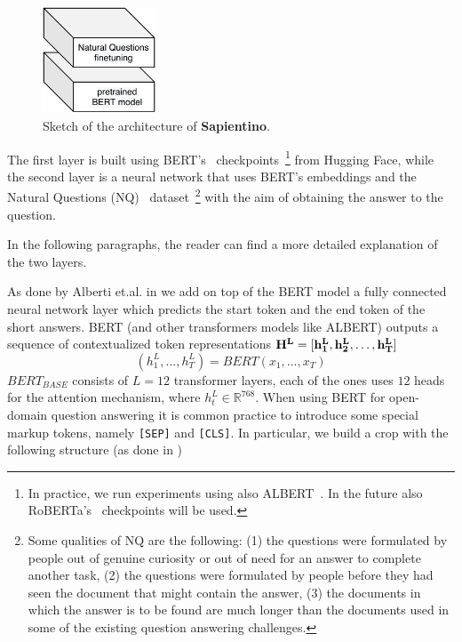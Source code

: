 \documentclass[10pt,hidelinks]{article}
\newcommand\nomefico{\textbf{Sapientino}}
\newcommand{\R}{\mathds{R}}
\begin{document}
\begin{figure}[ht!]
    \centering
    \includegraphics[width=0.3\textwidth]{pics/broad_architecture.pdf}
    \caption{Sketch of the architecture of \nomefico.}\label{fig:broad_architecture}
\end{figure}

The first layer is built using BERT's~\cite{devlin2018bert} checkpoints~\footnote{In practice, we run experiments using also ALBERT~\cite{albert}. In the future also RoBERTa's~\cite{roberta} checkpoints will be used.} from Hugging Face, while the second layer is a neural network that uses BERT's embeddings and the Natural Questions (NQ)~\cite{kwiatowski} dataset~\footnote{Some qualities of NQ are the following: (1) the questions were formulated by people out of genuine curiosity or out of need for an answer to complete another task, (2) the questions were formulated by people before they had seen the document that might contain the answer, (3) the documents in which the answer is to be found are much longer than the documents used in some of the existing question answering challenges.} with the aim of obtaining the answer to the question.

\noindent In the following paragraphs, the reader can find a more detailed explanation of the two layers.

As done by Alberti et.al. in \cite{alberti} we add on top of the BERT model a fully connected neural network layer which predicts the start token and the end token of the short answers. 
BERT (and other transformers models like ALBERT) outputs a sequence of contextualized token representations $\bf{H^L} = [h^L_1 , h^L_2 , \dots , h^L_T ]$
\begin{equation}
   (h^L_1, \dots , h^L_T) = BERT(x_1, \dots , x_T)
\end{equation}
$BERT_{BASE}$ consists of $L = 12$ transformer layers, each of the ones uses $12$ heads for the attention mechanism, where $h^L_t \in \R^{768}$.
When using BERT for open-domain question answering it is common practice to introduce some special markup tokens, namely \texttt{[SEP]} and \texttt{[CLS]}.
In particular, we build a crop with the following structure (as done in \cite{albert})
\end{document}

